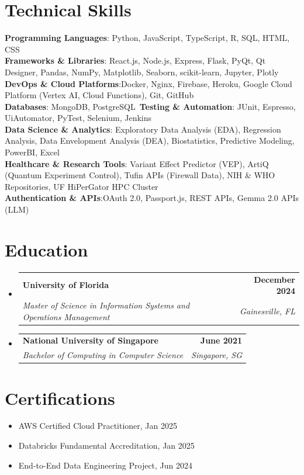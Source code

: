 \documentclass[letterpaper,11pt]{article}
\makeatletter
\newcommand{\resumeItem}[1]{
  \item\small{
    {#1 \vspace{-2pt}}
  }
}
\newcommand{\resumeSubheading}[4]{
  \vspace{-2pt}\item
    \begin{tabular*}{1.0\textwidth}[t]{l@{\extracolsep{\fill}}r}
      \textbf{#1} & \textbf{\small #2} \\
      \textit{\small#3} & \textit{\small #4} \\
    \end{tabular*}
}
\newcommand{\resumeSubHeadingListStart}{\begin{itemize}[leftmargin=0.0in, label={}]}
\newcommand{\resumeSubHeadingListEnd}{\end{itemize}}
\newcommand{\resumeItemListStart}{\begin{itemize}}
\newcommand{\resumeItemListEnd}{\end{itemize}}
\makeatother
\begin{document}
\section{Technical Skills}
\begin{itemize}[leftmargin=0.15in, label={}]
    \small{\item{
    \textbf{Programming Languages}{: Python, JavaScript, TypeScript, R, SQL, HTML, CSS} \\
    \textbf{Frameworks \& Libraries}{: React.js, Node.js, Express, Flask, PyQt, Qt Designer, Pandas, NumPy, Matplotlib, Seaborn, scikit-learn, Jupyter, Plotly} \\
    \textbf{DevOps \& Cloud Platforms}{:Docker, Nginx, Firebase, Heroku, Google Cloud Platform (Vertex AI, Cloud Functions), Git, GitHub}\\
    \textbf{Databases}{: MongoDB, PostgreSQL}\
    \textbf{Testing \& Automation}{: JUnit, Espresso, UiAutomator, PyTest, Selenium, Jenkins}\\
    \textbf{Data Science \& Analytics}{: Exploratory Data Analysis (EDA), Regression Analysis, Data Envelopment Analysis (DEA), Biostatistics, Predictive Modeling, PowerBI, Excel}\\
    \textbf{Healthcare \& Research Tools}{: Variant Effect Predictor (VEP), ArtiQ (Quantum Experiment Control), Tufin APIs (Firewall Data), NIH \& WHO Repositories, UF HiPerGator HPC Cluster}\\
    \textbf{Authentication \& APIs}{:OAuth 2.0, Passport.js, REST APIs, Gemma 2.0 APIs (LLM)} \\
    }}
\end{itemize}

\section{Education}
  \resumeSubHeadingListStart
    \resumeSubheading
      {University of Florida}{December 2024}
      {Master of Science in Information Systems and Operations Management}{Gainesville, FL}
    \resumeSubheading
      {National University of Singapore}{June 2021}
      {Bachelor of Computing in Computer Science}{Singapore, SG}
  \resumeSubHeadingListEnd
  
%

\section{Certifications}
   \resumeItemListStart
    \resumeItem{AWS Certified Cloud Practitioner, Jan 2025}
    \resumeItem{Databricks Fundamental Accreditation, Jan 2025}
    \resumeItem{End-to-End Data Engineering Project, Jun 2024}
   \resumeItemListEnd
\end{document}
